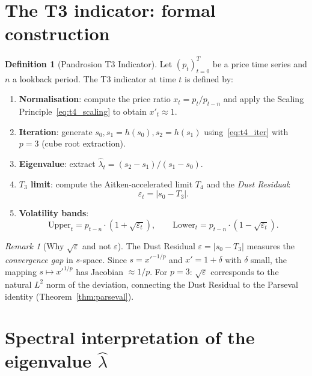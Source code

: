 \documentclass[10pt,a4paper,oneside]{book}
\theoremstyle{definition}
\newtheorem{definition}[theorem]{Definition}
\theoremstyle{remark}
\newtheorem{remark}[theorem]{Remark}
\begin{document}
\section{The T3 indicator: formal construction}

\begin{definition}[Pandrosion T3 Indicator]
\label{def:t4_indicator}
Let $(p_t)_{t=0}^T$ be a price time series and $n$ a lookback period.  The T3 indicator at time $t$ is defined by:
\begin{enumerate}[nosep]
\item \textbf{Normalisation}: compute the price ratio $x_t = p_t / p_{t-n}$ and apply the Scaling Principle~\eqref{eq:t4_scaling} to obtain $x'_t \approx 1$.
\item \textbf{Iteration}: generate $s_0, s_1 = h(s_0), s_2 = h(s_1)$ using~\eqref{eq:t4_iter} with $p = 3$ (cube root extraction).
\item \textbf{Eigenvalue}: extract $\hat{\lambda}_t = (s_2 - s_1)/(s_1 - s_0)$.
\item \textbf{$T_3$ limit}: compute the Aitken-accelerated limit $T_4$ and the \emph{Dust Residual}:
\begin{equation}
  \varepsilon_t = |s_0 - T_3|.
\end{equation}
\item \textbf{Volatility bands}:
\begin{equation}
  \text{Upper}_t = p_{t-n} \cdot (1 + \sqrt{\varepsilon_t}), \qquad
  \text{Lower}_t = p_{t-n} \cdot (1 - \sqrt{\varepsilon_t}).
\end{equation}
\end{enumerate}
\end{definition}

\begin{remark}[Why $\sqrt{\varepsilon}$ and not $\varepsilon$]
The Dust Residual $\varepsilon = |s_0 - T_3|$ measures the \emph{convergence gap} in $s$-space.  Since $s = x'^{-1/p}$ and $x' = 1 + \delta$ with $\delta$ small, the mapping $s \mapsto x'^{1/p}$ has Jacobian $\approx 1/p$.  For $p = 3$: $\sqrt{\varepsilon}$ corresponds to the natural $L^2$ norm of the deviation, connecting the Dust Residual to the Parseval identity (Theorem~\ref{thm:parseval}).
\end{remark}

\section{Spectral interpretation of the eigenvalue $\hat{\lambda}$}
\end{document}
